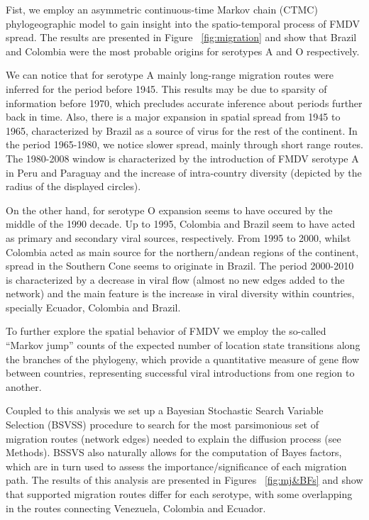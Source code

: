 \documentclass[10pt]{article}
\begin{document}
Fist, we employ an asymmetric continuous-time Markov chain (CTMC) phylogeographic model \cite{roots} to gain insight into the spatio-temporal process of FMDV spread.
The results are presented in Figure ~\ref{fig:migration} and show that Brazil and Colombia were the most probable origins for serotypes A and O respectively.

We can notice that for serotype A mainly long-range migration routes were inferred for the period before 1945.
This results may be due to sparsity of information before 1970, which precludes accurate inference about periods further back in time. 
Also, there is a major expansion in spatial spread from 1945 to 1965, characterized by Brazil as a source of virus for the rest of the continent.
In the period 1965-1980, we notice slower spread, mainly through short range routes.
The 1980-2008 window is characterized by the introduction of FMDV serotype A in Peru and Paraguay and the increase of intra-country diversity (depicted by the radius of the displayed circles).   

On the other hand, for serotype O expansion seems to have occured by the middle of the 1990 decade.
Up to 1995, Colombia and Brazil seem to have acted as primary and secondary viral sources, respectively.
From 1995 to 2000, whilst Colombia acted as main source for the northern/andean regions of the continent, spread in the Southern Cone seems to originate in Brazil.
The period 2000-2010 is characterized by a decrease in viral flow (almost no new edges added to the network) and the main feature is the increase in viral diversity within countries, specially Ecuador, Colombia and Brazil.
	
To further explore the spatial behavior of FMDV we employ the so-called ``Markov jump'' counts \cite{Minin2008} of the expected number of location state transitions along the  branches of the phylogeny, which  provide a quantitative measure of gene flow between countries, representing successful viral introductions from one region to another.

Coupled to this analysis we set up a Bayesian Stochastic Search Variable Selection (BSVSS) procedure to search for the most parsimonious set of migration routes (network edges) needed to explain the diffusion process (see Methods).
BSSVS also naturally allows for the computation of Bayes factors, which are in turn used to assess the importance/significance of each migration path.
The results of this analysis are presented in Figures ~\ref{fig:mj&BFs} and show that supported migration routes differ for each serotype, with some overlapping in the routes connecting Venezuela, Colombia and Ecuador.
\end{document}
